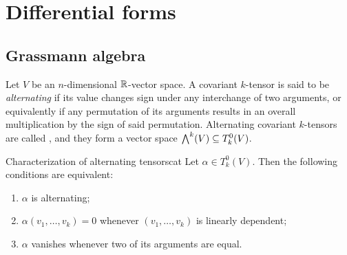 \section{Differential forms}

\subsection{Grassmann algebra}

Let $ V $ be an $ n $-dimensional $ \mathbb{R} $-vector space. A covariant $ k $-tensor is said to be \emph{alternating} if its value changes sign under any interchange of two arguments, or equivalently if any permutation of its arguments results in an overall multiplication by the sign of said permutation. Alternating covariant $ k $-tensors are called , and they form a vector space $ {\bigwedge}^{k}(V) \subseteq T^0_k(V) $.

\begin{lemma}{Characterization of alternating tensors}{cat}
  Let $ \alpha \in T^0_k(V) $. Then the following conditions are equivalent:
  \begin{enumerate}
    \item \label{item:cat-1} $ \alpha $ is alternating;
    \item \label{item:cat-2} $ \alpha(v_1 , \dots , v_k) = 0 $ whenever $ (v_1 , \dots , v_k) $ is linearly dependent;
    \item \label{item:cat-3} $ \alpha $ vanishes whenever two of its arguments are equal.
  \end{enumerate}
\end{lemma}

